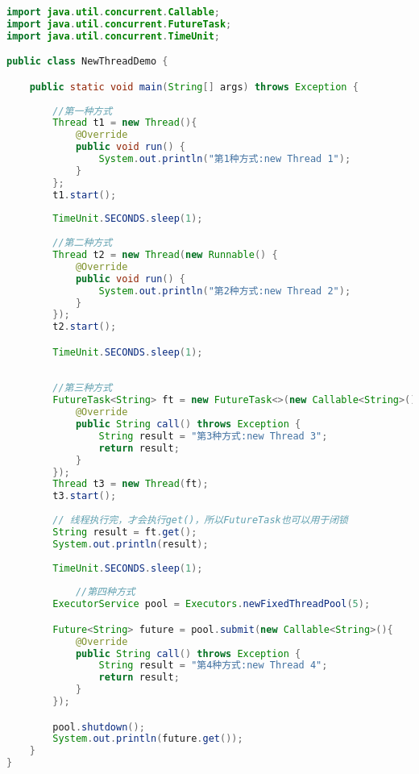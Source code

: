 \documentclass[../../../interview-questions.tex]{subfiles}
\begin{document}
\begin{lstlisting}[language=Java]
import java.util.concurrent.Callable;
import java.util.concurrent.FutureTask;
import java.util.concurrent.TimeUnit;

public class NewThreadDemo {

    public static void main(String[] args) throws Exception {
            
        //第一种方式
        Thread t1 = new Thread(){
            @Override
            public void run() {
                System.out.println("第1种方式:new Thread 1");
            }
        };
        t1.start();
        
        TimeUnit.SECONDS.sleep(1);
        
        //第二种方式
        Thread t2 = new Thread(new Runnable() {
            @Override
            public void run() {
                System.out.println("第2种方式:new Thread 2");
            }
        });
        t2.start();

        TimeUnit.SECONDS.sleep(1);
        
        
        //第三种方式
        FutureTask<String> ft = new FutureTask<>(new Callable<String>() {
            @Override
            public String call() throws Exception {
                String result = "第3种方式:new Thread 3";
                return result;
            }
        });
        Thread t3 = new Thread(ft);
        t3.start();
        
        // 线程执行完，才会执行get()，所以FutureTask也可以用于闭锁
        String result = ft.get();
        System.out.println(result);
        
        TimeUnit.SECONDS.sleep(1);
        
            //第四种方式
        ExecutorService pool = Executors.newFixedThreadPool(5);

        Future<String> future = pool.submit(new Callable<String>(){
            @Override
            public String call() throws Exception {
                String result = "第4种方式:new Thread 4";
                return result;
            }
        });

        pool.shutdown();
        System.out.println(future.get());
    }
}       
\end{lstlisting}
\end{document}
